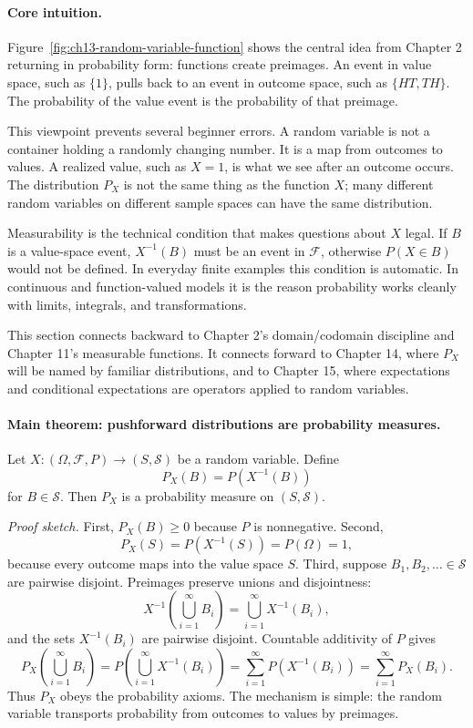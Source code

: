 \paragraph{Core intuition.}
Figure~\ref{fig:ch13-random-variable-function} shows the central idea from Chapter 2 returning in probability form: functions create preimages. An event in value space, such as \(\{1\}\), pulls back to an event in outcome space, such as \(\{HT,TH\}\). The probability of the value event is the probability of that preimage.

This viewpoint prevents several beginner errors. A random variable is not a container holding a randomly changing number. It is a map from outcomes to values. A realized value, such as \(X=1\), is what we see after an outcome occurs. The distribution \(P_X\) is not the same thing as the function \(X\); many different random variables on different sample spaces can have the same distribution.

Measurability is the technical condition that makes questions about \(X\) legal. If \(B\) is a value-space event, \(X^{-1}(B)\) must be an event in \(\mathcal{F}\), otherwise \(P(X\in B)\) would not be defined. In everyday finite examples this condition is automatic. In continuous and function-valued models it is the reason probability works cleanly with limits, integrals, and transformations.

This section connects backward to Chapter 2's domain/codomain discipline and Chapter 11's measurable functions. It connects forward to Chapter 14, where \(P_X\) will be named by familiar distributions, and to Chapter 15, where expectations and conditional expectations are operators applied to random variables.

\paragraph{Main theorem: pushforward distributions are probability measures.}
Let \(X:(\Omega,\mathcal{F},P)\to(S,\mathcal{S})\) be a random variable. Define
\[
P_X(B)=P(X^{-1}(B))
\]
for \(B\in\mathcal{S}\). Then \(P_X\) is a probability measure on \((S,\mathcal{S})\).

\emph{Proof sketch.}
First, \(P_X(B)\geq0\) because \(P\) is nonnegative. Second,
\[
P_X(S)=P(X^{-1}(S))=P(\Omega)=1,
\]
because every outcome maps into the value space \(S\). Third, suppose \(B_1,B_2,\ldots\in\mathcal{S}\) are pairwise disjoint. Preimages preserve unions and disjointness:
\[
X^{-1}\!\left(\bigcup_{i=1}^{\infty}B_i\right)
=
\bigcup_{i=1}^{\infty}X^{-1}(B_i),
\]
and the sets \(X^{-1}(B_i)\) are pairwise disjoint. Countable additivity of \(P\) gives
\[
P_X\!\left(\bigcup_{i=1}^{\infty}B_i\right)
=
P\!\left(\bigcup_{i=1}^{\infty}X^{-1}(B_i)\right)
=
\sum_{i=1}^{\infty}P(X^{-1}(B_i))
=
\sum_{i=1}^{\infty}P_X(B_i).
\]
Thus \(P_X\) obeys the probability axioms. The mechanism is simple: the random variable transports probability from outcomes to values by preimages.

